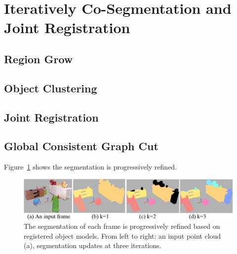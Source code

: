 \section{Iteratively Co-Segmentation and Joint Registration}
\label{sec:segmentation}
\subsection{Region Grow}
\subsection{Object Clustering}
\subsection{Joint Registration}
\subsection{Global Consistent Graph Cut}
Figure~\ref{fig:object-iterations} shows the segmentation is progressively refined. 

\begin{figure}
\centering
\includegraphics[width=2\columnwidth]{figures/object-iterations.png}
\caption{ The segmentation of each frame is progressively refined based on registered object models. From left to right: an input point cloud (a), segmentation updates at three iterations.  	 }
\label{fig:object-iterations}
\end{figure}
